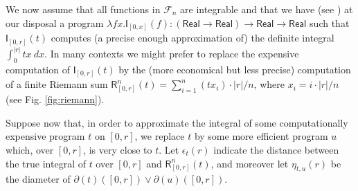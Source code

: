 \begin{example}
We now assume that all functions in $\mathcal F_{n}$ are integrable and that we have (see \cite{Edalat:2000aa}) at our disposal a program $\lambda fx.\mathsf I_{[0,x]}(f): (\mathsf{Real}\to \mathsf{Real})\to \mathsf{Real}\to \mathsf{Real}$ such that $\mathsf I_{[0,r]}(t)$ computes (a precise enough approximation of) the definite integral $\int_{0}^{|r|}tx \ dx$.
In many contexts we might prefer to replace the expensive computation of $\mathsf I_{[0,r]}(t)$ by the (more economical but less precise) computation of a finite Riemann sum $\mathsf R^{n}_{[0,r]}(t)=  \sum_{i=1}^{n}(tx_{i})\cdot |r|/n$, where 
 $x_{i}=  i\cdot |r|/n$ (see Fig. \ref{fig:riemann}).  

%
%


Suppose now that, in order to approximate the integral of some computationally expensive program $t$ on $[0,r]$, we replace $t$ by some more efficient program $u$ which, over $[0,r]$, is very close to $t$. Let $\epsilon_{t}(r)$ indicate the distance between the true integral of $t$ over $[0,r]$ and $\mathsf{R}^{n}_{[0,r]}(t)$,
 and moreover let 
$\eta_{t,u}(r)$ be the diameter of $\partial(t)([0,r])\vee\partial(u)([0,r])$.


\end{example}
